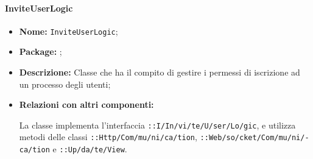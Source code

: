 \paragraph{InviteUserLogic}
\begin{flushleft}
\begin{itemize}
\item \textbf{Nome:} \texttt{InviteUserLogic};
\item \textbf{Package:} \texttt{\logicAdmin{}};
\item \textbf{Descrizione:} Classe che ha il compito di gestire i permessi di iscrizione ad un processo degli utenti;
\item \textbf{Relazioni con altri componenti:}
\begin{sloppypar}
La classe implementa l'interfaccia \texttt{\iLogicAdmin{}::I\fshyp{}In\fshyp{}vi\fshyp{}te\fshyp{}U\fshyp{}ser\fshyp{}Lo\fshyp{}gic}, e utilizza metodi delle classi \texttt{\serverCommunication{}::Http\fshyp{}Com\fshyp{}mu\fshyp{}ni\fshyp{}ca\fshyp{}tion}, \texttt{\serverCommunication{}::Web\fshyp{}so\fshyp{}cket\fshyp{}Com\fshyp{}mu\fshyp{}ni\fshyp{}ca\fshyp{}tion} e \texttt{\logicAdmin{}::Up\fshyp{}da\fshyp{}te\fshyp{}View}.
\end{sloppypar}
\end{itemize}
\end{flushleft}